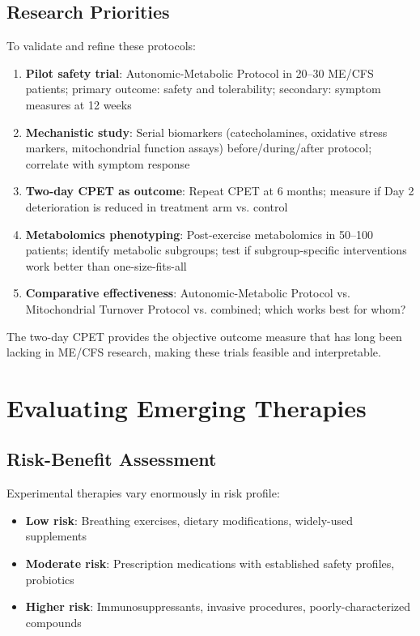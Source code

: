 \subsection{Research Priorities}

To validate and refine these protocols:
\begin{enumerate}
    \item \textbf{Pilot safety trial}: Autonomic-Metabolic Protocol in 20--30 ME/CFS patients; primary outcome: safety and tolerability; secondary: symptom measures at 12 weeks

    \item \textbf{Mechanistic study}: Serial biomarkers (catecholamines, oxidative stress markers, mitochondrial function assays) before/during/after protocol; correlate with symptom response

    \item \textbf{Two-day CPET as outcome}: Repeat CPET at 6 months; measure if Day 2 deterioration is reduced in treatment arm vs. control

    \item \textbf{Metabolomics phenotyping}: Post-exercise metabolomics in 50--100 patients; identify metabolic subgroups; test if subgroup-specific interventions work better than one-size-fits-all

    \item \textbf{Comparative effectiveness}: Autonomic-Metabolic Protocol vs. Mitochondrial Turnover Protocol vs. combined; which works best for whom?
\end{enumerate}

The two-day CPET provides the objective outcome measure that has long been lacking in ME/CFS research, making these trials feasible and interpretable.


\section{Evaluating Emerging Therapies}
\label{sec:evaluating-therapies}

\subsection{Risk-Benefit Assessment}

Experimental therapies vary enormously in risk profile:
\begin{itemize}
    \item \textbf{Low risk}: Breathing exercises, dietary modifications, widely-used supplements
    \item \textbf{Moderate risk}: Prescription medications with established safety profiles, probiotics
    \item \textbf{Higher risk}: Immunosuppressants, invasive procedures, poorly-characterized compounds
\end{itemize}

